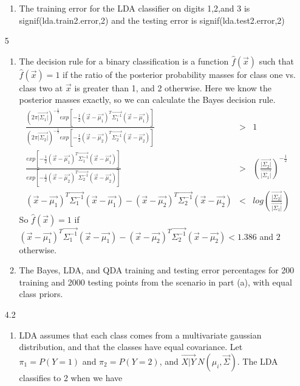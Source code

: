 \documentclass{article}
\begin{document}
\begin{enumerate}
\begin{enumerate}
      \item The training error for the LDA classifier on digits 1,2,and 3 is signif(lda.train2.error,2) and the testing error is signif(lda.test2.error,2)

    \end{enumerate}
  \item[5] 
    \begin{enumerate}
      \item The decision rule for a binary classification is a function $\hat{f}(\vec{x})$ such that $\hat{f}(\vec{x}) = 1$ if the ratio of the posterior probability masses for class one vs. class two at $\vec{x}$ is greater than 1, and 2 otherwise. Here we know the posterior masses exactly, so we can calculate the Bayes decision rule. 
      \begin{eqnarray*}
          \frac{(2\pi\vec{|\Sigma_1|})^{-\frac{1}{2}}exp\left[-\frac{1}{2}(\vec{x}-\vec{\mu_1})^T\vec{\Sigma_1^{-1}}(\vec{x}-\vec{\mu_1})\right]}{(2\pi\vec{|\Sigma_2|})^{-\frac{1}{2}}exp\left[-\frac{1}{2}(\vec{x}-\vec{\mu_2})^T\vec{\Sigma_2^{-1}}(\vec{x}-\vec{\mu_2})\right]} &>& 1 \\
          \frac{exp\left[-\frac{1}{2}(\vec{x}-\vec{\mu_1})^T\vec{\Sigma_1^{-1}}(\vec{x}-\vec{\mu_1})\right]}{exp\left[-\frac{1}{2}(\vec{x}-\vec{\mu_2})^T\vec{\Sigma_2^{-1}}(\vec{x}-\vec{\mu_2})\right]} &>& \left(\frac{\vec{|\Sigma_2|}}{\vec{|\Sigma_1|}}\right)^{-\frac{1}{2}} \\
        (\vec{x}-\vec{\mu_1})^T\vec{\Sigma_1^{-1}}(\vec{x}-\vec{\mu_1})-(\vec{x}-\vec{\mu_2})^T\vec{\Sigma_2^{-1}}(\vec{x}-\vec{\mu_2}) &<& log\left(\frac{\vec{|\Sigma_2|}}{\vec{|\Sigma_1|}}\right)
      \end{eqnarray*}
      So $\hat{f}(\vec{x}) = 1$ if $(\vec{x}-\vec{\mu_1})^T\vec{\Sigma_1^{-1}}(\vec{x}-\vec{\mu_1})-(\vec{x}-\vec{\mu_2})^T\vec{\Sigma_2^{-1}}(\vec{x}-\vec{\mu_2}) < 1.386$ and $2$ otherwise.
      \newpage
      \item The Bayes, LDA, and QDA training and testing error percentages for 200 training and 2000 testing points from the scenario in part (a), with equal class priors.
    \end{enumerate}
  \item[4.2]
    \begin{enumerate}
      \item LDA assumes that each class comes from a multivariate gaussian distribution, and that the classes have equal covariance. Let $\pi_1=P(Y=1)$ and $\pi_2=P(Y=2)$, and $\vec{X|Y} ~ N(\mu_i,\vec{\Sigma})$. The LDA classifies to 2 when we have

\end{enumerate}
\end{enumerate}
\end{document}
